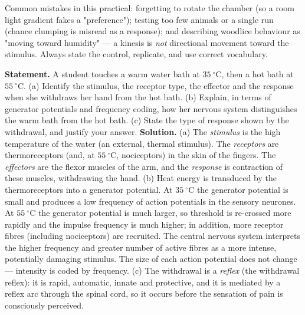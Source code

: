 \documentclass[11pt]{article}
\begin{document}
\begin{attention}
Common mistakes in this practical: forgetting to rotate the chamber (so a room light gradient fakes a "preference"); testing too few animals or a single run (chance clumping is misread as a response); and describing woodlice behaviour as "moving toward humidity" — a kinesis is \emph{not} directional movement toward the stimulus. Always state the control, replicate, and use correct vocabulary.
\end{attention}

\begin{exoresolu}
\textbf{Statement.} A student touches a warm water bath at $35\ ^{\circ}\mathrm{C}$, then a hot bath at $55\ ^{\circ}\mathrm{C}$. (a) Identify the stimulus, the receptor type, the effector and the response when she withdraws her hand from the hot bath. (b) Explain, in terms of generator potentials and frequency coding, how her nervous system distinguishes the warm bath from the hot bath. (c) State the type of response shown by the withdrawal, and justify your answer.
\tcblower
\textbf{Solution.}
(a) The \emph{stimulus} is the high temperature of the water (an external, thermal stimulus). The \emph{receptors} are thermoreceptors (and, at $55\ ^{\circ}\mathrm{C}$, nociceptors) in the skin of the fingers. The \emph{effectors} are the flexor muscles of the arm, and the \emph{response} is contraction of these muscles, withdrawing the hand.
(b) Heat energy is transduced by the thermoreceptors into a generator potential. At $35\ ^{\circ}\mathrm{C}$ the generator potential is small and produces a low frequency of action potentials in the sensory neurones. At $55\ ^{\circ}\mathrm{C}$ the generator potential is much larger, so threshold is re-crossed more rapidly and the impulse frequency is much higher; in addition, more receptor fibres (including nociceptors) are recruited. The central nervous system interprets the higher frequency and greater number of active fibres as a more intense, potentially damaging stimulus. The size of each action potential does not change — intensity is coded by frequency.
(c) The withdrawal is a \emph{reflex} (the withdrawal reflex): it is rapid, automatic, innate and protective, and it is mediated by a reflex arc through the spinal cord, so it occurs before the sensation of pain is consciously perceived.
\end{exoresolu}
\end{document}
